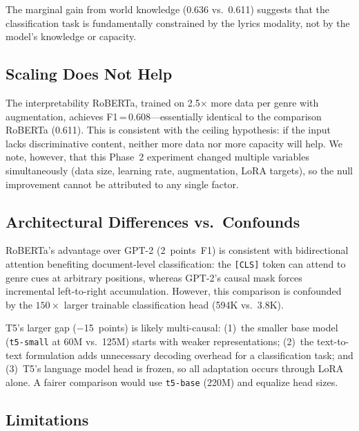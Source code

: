 \documentclass[11pt,a4paper]{article}
\begin{document}
\noindent
The marginal gain from world knowledge (0.636 vs.\ 0.611) suggests
that the classification task is fundamentally constrained by the
lyrics modality, not by the model's knowledge or capacity.

\subsection{Scaling Does Not Help}

The interpretability RoBERTa, trained on 2.5$\times$ more data per genre
with augmentation, achieves F1\,=\,0.608---essentially identical to the
comparison RoBERTa (0.611).
This is consistent with the ceiling hypothesis: if the input lacks
discriminative content, neither more data nor more capacity will help.
We note, however, that this Phase~2 experiment changed multiple
variables simultaneously (data size, learning rate, augmentation, LoRA
targets), so the null improvement cannot be attributed to any single
factor.

\subsection{Architectural Differences vs.\ Confounds}

RoBERTa's advantage over GPT-2 (2~points~F1) is consistent with
bidirectional attention benefiting document-level classification: the
\texttt{[CLS]} token can attend to genre cues at arbitrary positions,
whereas GPT-2's causal mask forces incremental left-to-right
accumulation.
However, this comparison is confounded by the $150\times$ larger
trainable classification head (594K vs.\ 3.8K).

T5's larger gap ($-$15~points) is likely multi-causal:
(1)~the smaller base model (\texttt{t5-small} at 60M vs.\ 125M) starts
with weaker representations;
(2)~the text-to-text formulation adds unnecessary decoding overhead for
a classification task;
and (3)~T5's language model head is frozen, so all adaptation occurs
through LoRA alone.
A fairer comparison would use \texttt{t5-base} (220M) and equalize
head sizes.

\subsection{Limitations}
\label{sec:limitations}
\end{document}
